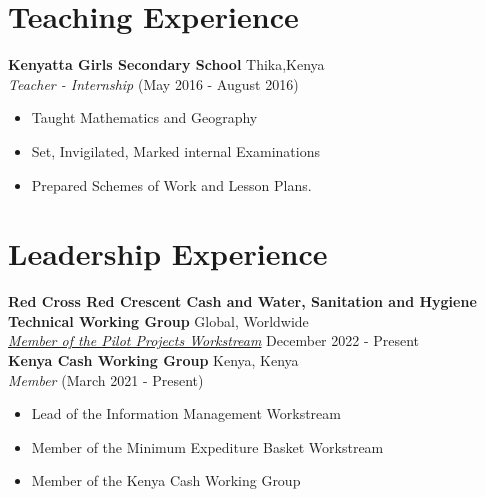 \documentclass[line,margin,10pt]{res}
\begin{document}
\begin{resume}
\section{Teaching Experience}
\textbf{Kenyatta Girls Secondary School} \hfill Thika,Kenya\\
{\sl Teacher - Internship} \hfill (May 2016 - August 2016)
\begin{itemize} \itemsep -2pt
    \item Taught Mathematics and Geography
    \item Set, Invigilated, Marked internal Examinations
    \item Prepared Schemes of Work and Lesson Plans.
\end{itemize}
{\vspace{-0.25cm}}

\section{Leadership Experience}
\textbf{Red Cross Red Crescent Cash and Water, Sanitation and Hygiene Technical Working Group} \hfill Global, Worldwide\\
{\sl \href{https://sites.google.com/view/twgcashandwash/about-twg/membership#h.2r4pyiwuqh4k}{Member of the Pilot Projects Workstream}} \hfill December 2022 - Present \\
\textbf{Kenya Cash Working Group} \hfill Kenya, Kenya\\
{\sl Member} \hfill (March 2021 - Present)
\begin{itemize} \itemsep -2pt
    \item Lead of the Information Management Workstream
    \item Member of the Minimum Expediture Basket Workstream
    \item Member of the Kenya Cash Working Group
\end{itemize}
{\vspace{-0.25cm}}


\end{resume}
\end{document}

